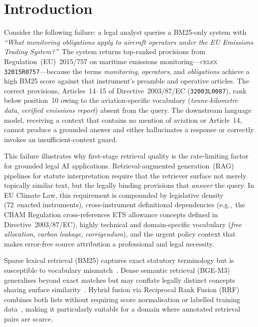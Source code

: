 \documentclass{iosart2x}
\newcommand{\bgem}{BGE-M3\xspace}
\newcommand{\rrf}{RRF\xspace}
\begin{document}
\section{Introduction}
\label{sec:intro}

Consider the following failure: a legal analyst queries a BM25-only system
with \textit{``What monitoring obligations apply to aircraft operators under
the EU Emissions Trading System?''}\  The system returns top-ranked
provisions from Regulation~(EU)~2015/757 on maritime emissions
monitoring---\textsc{celex} \texttt{32015R0757}---because the terms
\textit{monitoring}, \textit{operators}, and \textit{obligations} achieve a
high BM25 score against that instrument's preamble and operative articles.
The correct provisions, Articles~14--15 of Directive~2003/87/EC
(\texttt{32003L0087}), rank below position~10 owing to the
aviation-specific vocabulary (\textit{tonne-kilometre data},
\textit{verified emissions report}) absent from the query.  The downstream
language model, receiving a context that contains no mention of aviation
or Article~14, cannot produce a grounded answer and either hallucinates a
response or correctly invokes an insufficient-context guard.

This failure illustrates why first-stage retrieval quality is the
rate-limiting factor for grounded legal AI applications.
Retrieval-augmented generation~(RAG) pipelines for statute interpretation
require that the retriever surface not merely topically similar text, but
the legally binding provisions that \emph{answer} the query.  In EU
Climate Law, this requirement is compounded by legislative density
(72~enacted instruments), cross-instrument definitional dependencies
(e.g.,\ the CBAM Regulation cross-references ETS allowance concepts
defined in Directive~2003/87/EC), highly technical and
domain-specific vocabulary (\textit{free allocation},
\textit{carbon leakage}, \textit{corrigendum}), and the urgent policy
context that makes error-free source attribution a professional and
legal necessity.

Sparse lexical retrieval (BM25) captures exact statutory terminology
but is susceptible to vocabulary mismatch~\cite{robertson2009bm25}.
Dense semantic retrieval (\bgem) generalises beyond exact matches but
may conflate legally distinct concepts sharing surface
similarity~\cite{chen2024bgem3}.  Hybrid fusion via Reciprocal Rank
Fusion (\rrf) combines both lists without requiring score normalisation
or labelled training data~\cite{cormack2009rrf}, making it particularly
suitable for a domain where annotated retrieval pairs are scarce.
\end{document}
